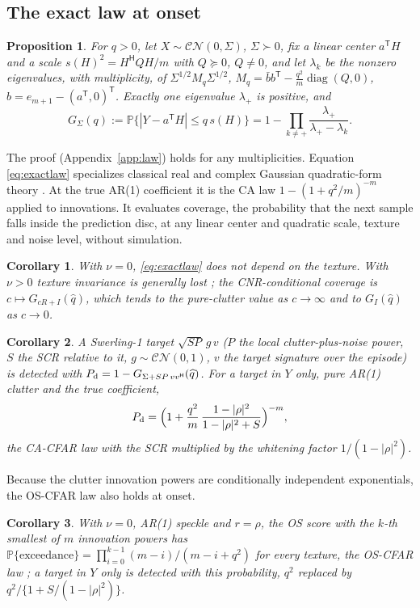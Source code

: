 \documentclass[journal]{IEEEtran}
\newtheorem{proposition}{Proposition}
\newtheorem{corollary}{Corollary}
\newcommand{\PP}{\mathbb{P}}
\begin{document}
\subsection{The exact law at onset}\label{sec:onsetlaws}
\begin{proposition}\label{prop:law}
For $q>0$, let $X\sim\mathcal{CN}(0,\Sigma)$, $\Sigma\succ0$, fix a linear center $a^{\mathsf T}H$ and a scale $s(H)^2=H^{\mathsf H}QH/m$ with $Q\succeq0$, $Q\ne0$, and let $\lambda_k$ be the nonzero eigenvalues, with multiplicity, of $\Sigma^{1/2}M_q\Sigma^{1/2}$, $M_q=\bar bb^{\mathsf T}-\frac{q^2}{m}\operatorname{diag}(Q,0)$, $b=e_{m+1}-(a^{\mathsf T},0)^{\mathsf T}$. Exactly one eigenvalue $\lambda_+$ is positive, and
\begin{equation}
G_\Sigma(q):=\PP\{|Y-a^{\mathsf T}H|\le q\,s(H)\}=1-\prod_{k\ne+}\frac{\lambda_+}{\lambda_+-\lambda_k}.
\label{eq:exactlaw}
\end{equation}
\end{proposition}
The proof (Appendix~\ref{app:law}) holds for any multiplicities. Equation \eqref{eq:exactlaw} specializes classical real and complex Gaussian quadratic-form theory \cite{imhof1961,alnaffouri2016}. At the true AR(1) coefficient it is the CA law $1-(1+q^2/m)^{-m}$ \cite{finn1968,gandhi1988} applied to innovations. It evaluates coverage, the probability that the next sample falls inside the prediction disc, at any linear center and quadratic scale, texture and noise level, without simulation.
\begin{corollary}\label{cor:texture}
With $\nu=0$, \eqref{eq:exactlaw} does not depend on the texture. With $\nu>0$ texture invariance is generally lost \cite{gini1997,watts1987}; the CNR-conditional coverage is $c\mapsto G_{cR+I}(\widehat q)$, which tends to the pure-clutter value as $c\to\infty$ and to $G_I(\widehat q)$ as $c\to0$.
\end{corollary}
\begin{corollary}\label{cor:detect}
A Swerling-1 target $\sqrt{SP}\,g\,v$ ($P$ the local clutter-plus-noise power, $S$ the SCR relative to it, $g\sim\mathcal{CN}(0,1)$, $v$ the target signature over the episode) is detected with $P_{\rm d}=1-G_{\Sigma+SP\,vv^{\mathsf H}}(\widehat q)$. For a target in $Y$ only, pure AR(1) clutter and the true coefficient,
\begin{equation}
P_{\rm d}=\Big(1+\frac{q^2}{m}\,\frac{1-|\rho|^2}{1-|\rho|^2+S}\Big)^{-m},
\label{eq:pdclosed}
\end{equation}
the CA-CFAR law with the SCR multiplied by the whitening factor $1/(1-|\rho|^2)$.
\end{corollary}
Because the clutter innovation powers are conditionally independent exponentials, the OS-CFAR law also holds at onset.
\begin{corollary}\label{cor:os}
With $\nu=0$, AR(1) speckle and $r=\rho$, the OS score with the $k$-th smallest of $m$ innovation powers has $\PP\{\text{exceedance}\}=\prod_{i=0}^{k-1}(m-i)/(m-i+q^2)$ for every texture, the OS-CFAR law \cite{rohling1983}; a target in $Y$ only is detected with this probability, $q^2$ replaced by $q^2/\{1+S/(1-|\rho|^2)\}$.
\end{corollary}
\end{document}
